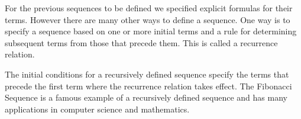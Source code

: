 \documentclass[12pt letter]{report}
\begin{document}
For the previous sequences to be defined we specified explicit formulas for their terms. However there are many other
ways to define a sequence. One way is to specify a sequence based on one or more initial terms and a rule for
determining subsequent terms from those that precede them. This is called a recurrence relation.



The initial conditions for a recursively defined sequence specify the terms that precede the first term where the
recurrence relation takes effect. The Fibonacci Sequence is a famous example of a recursively defined sequence and has
many applications in computer science and mathematics.
\end{document}
